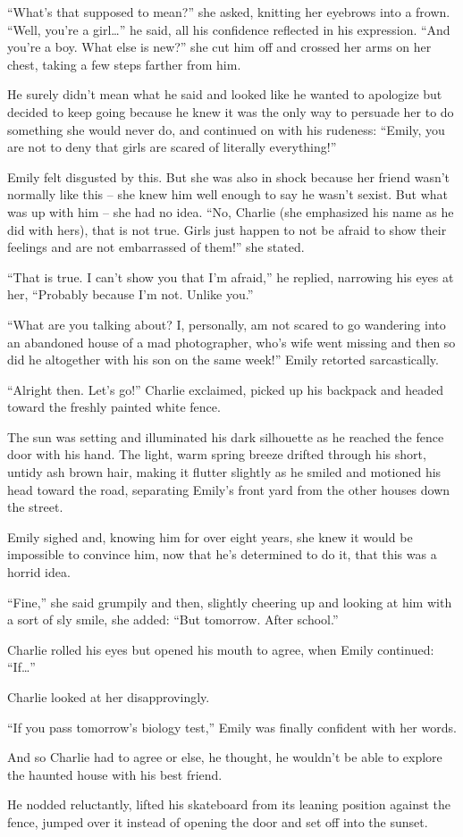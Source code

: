 “What’s that supposed to mean?” she asked, knitting her eyebrows into a frown.
“Well, you’re a girl…” he said, all his confidence reflected in his expression.
“And you’re a boy.
What else is new?” she cut him off and crossed her arms on her chest, taking a few steps farther from him.

He surely didn’t mean what he said and looked like he wanted to apologize but decided to keep going because he knew it was the only way to persuade her to do something she would never do, and continued on with his rudeness: 
“Emily, you are not to deny that girls are scared of literally everything!”

Emily felt disgusted by this. But she was also in shock because her friend wasn’t normally like this – she knew him well enough to say he wasn’t sexist. But what was up with him – she had no idea.
“No, Charlie (she emphasized his name as he did with hers), that is not true. Girls just happen to not be afraid to show their feelings and are not embarrassed of them!” she stated.

“That is true. I can’t show you that I’m afraid,” he replied, narrowing his eyes at her, “Probably because I’m not. Unlike you.”

“What are you talking about? I, personally, am not scared to go wandering into an abandoned house of a mad photographer, who’s wife went missing and then so did he altogether with his son on the same week!” Emily retorted sarcastically.

“Alright then. Let’s go!” Charlie exclaimed, picked up his backpack and headed toward the freshly painted white fence.

The sun was setting and illuminated his dark silhouette as he reached the fence door with his hand. The light, warm spring breeze drifted through his short, untidy ash brown hair, making it flutter slightly as he smiled and motioned his head toward the road, separating Emily’s front yard from the other houses down the street.

Emily sighed and, knowing him for over eight years, she knew it would be impossible to convince him, now that he’s determined to do it, that this was a horrid idea.

“Fine,” she said grumpily and then, slightly cheering up and looking at him with a sort of sly smile, she added: “But tomorrow. After school.”

Charlie rolled his eyes but opened his mouth to agree, when Emily continued: “If…”  

Charlie looked at her disapprovingly.

“If you pass tomorrow’s biology test,” Emily was finally confident with her words.    

And so Charlie had to agree or else, he thought, he wouldn’t be able to explore the haunted house with his best friend.
 
He nodded reluctantly, lifted his skateboard from its leaning position against the fence, jumped over it instead of opening the door and set off into the sunset.

